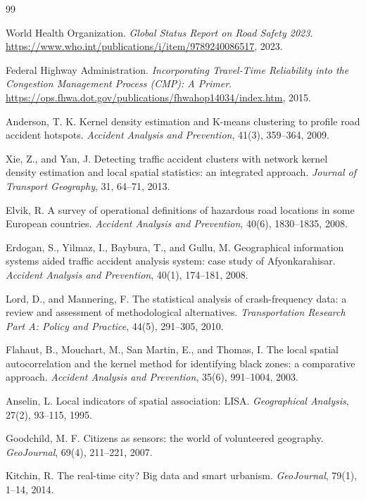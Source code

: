 ﻿\documentclass[12pt,a4paper]{report}
\begin{document}
\clearpage
{}
\begin{thebibliography}{99}

World Health Organization. \emph{Global Status Report on Road Safety 2023}.
\url{https://www.who.int/publications/i/item/9789240086517}, 2023.

Federal Highway Administration. \emph{Incorporating Travel-Time Reliability into the Congestion Management Process (CMP): A Primer}.
\url{https://ops.fhwa.dot.gov/publications/fhwahop14034/index.htm}, 2015.

Anderson, T. K. Kernel density estimation and K-means clustering to profile road accident hotspots. \emph{Accident Analysis and Prevention}, 41(3), 359--364, 2009.

Xie, Z., and Yan, J. Detecting traffic accident clusters with network kernel density estimation and local spatial statistics: an integrated approach. \emph{Journal of Transport Geography}, 31, 64--71, 2013.

Elvik, R. A survey of operational definitions of hazardous road locations in some European countries. \emph{Accident Analysis and Prevention}, 40(6), 1830--1835, 2008.

Erdogan, S., Yilmaz, I., Baybura, T., and Gullu, M. Geographical information systems aided traffic accident analysis system: case study of Afyonkarahisar. \emph{Accident Analysis and Prevention}, 40(1), 174--181, 2008.

Lord, D., and Mannering, F. The statistical analysis of crash-frequency data: a review and assessment of methodological alternatives. \emph{Transportation Research Part A: Policy and Practice}, 44(5), 291--305, 2010.

Flahaut, B., Mouchart, M., San Martin, E., and Thomas, I. The local spatial autocorrelation and the kernel method for identifying black zones: a comparative approach. \emph{Accident Analysis and Prevention}, 35(6), 991--1004, 2003.

Anselin, L. Local indicators of spatial association: LISA. \emph{Geographical Analysis}, 27(2), 93--115, 1995.

Goodchild, M. F. Citizens as sensors: the world of volunteered geography. \emph{GeoJournal}, 69(4), 211--221, 2007.

Kitchin, R. The real-time city? Big data and smart urbanism. \emph{GeoJournal}, 79(1), 1--14, 2014.


\end{thebibliography}
\end{document}
